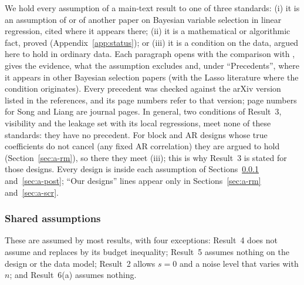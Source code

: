 We hold every assumption of a main-text result to one of three standards: (i) it is an assumption of \SL{} or of
another paper on Bayesian variable selection in linear regression, cited where it appears there; (ii) it is a
mathematical or algorithmic fact, proved (Appendix~\ref{app:status}); or (iii) it is a condition on the data, argued here
to hold in ordinary data. Each paragraph
opens with the comparison with \SL, gives the evidence, what the assumption excludes and, under ``Precedents'', where it
appears in other Bayesian selection papers (with the Lasso literature where the condition originates). Every precedent was checked against the arXiv
version listed in the references, and its page numbers refer to that version; page numbers for Song and Liang are journal
pages. In general, two conditions of Result~3, visibility and the leakage set with its local regressions, meet none of
these standards: they have no precedent. For block and AR designs whose true coefficients do not cancel (any fixed AR correlation) they are argued to hold
(Section~\ref{sec:a-rm}), so there they meet (iii); this is why Result~3 is stated for those designs. Every design is inside each assumption of Sections~\ref{sec:a-all}
and~\ref{sec:a-post}; ``Our designs'' lines appear only in Sections~\ref{sec:a-rm} and~\ref{sec:a-scr}.

\subsubsection{Shared assumptions}\label{sec:a-all}

These are assumed by most results, with four exceptions: Result~4 does not assume  and replaces  by its
budget inequality; Result~5 assumes nothing on the design or the data model; Result~2 allows $s=0$ and a
noise level that varies with $n$; and Result~6(a) assumes nothing.


